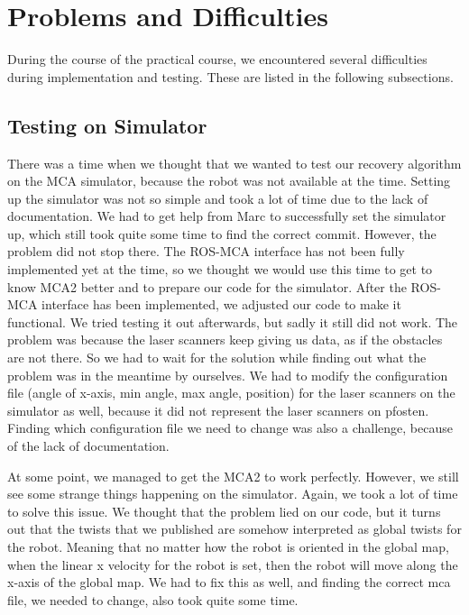 \section{Problems and Difficulties} \label{problems}
During the course of the practical course, we encountered several difficulties during implementation and testing. These are listed in the following subsections.

\subsection{Testing on Simulator}

There was a time when we thought that we wanted to test our recovery algorithm on the MCA simulator, because the robot was not available at the time. Setting up the simulator was not so simple and took a lot of time due to the lack of documentation. We had to get help from Marc to successfully set the simulator up, which still took quite some time to find the correct commit. However, the problem did not stop there. The ROS-MCA interface has not been fully implemented yet at the time, so we thought we would use this time to get to know MCA2 better and to prepare our code for the simulator. After the ROS-MCA interface has been implemented, we adjusted our code to make it functional. We tried testing it out afterwards, but sadly it still did not work. The problem was because the laser scanners keep giving us data, as if the obstacles are not there. So we had to wait for the solution while finding out what the problem was in the meantime by ourselves. We had to modify the configuration file (angle of x-axis, min angle, max angle, position) for the laser scanners on the simulator as well, because it did not represent the laser scanners on pfosten. Finding which configuration file we need to change was also a challenge, because of the lack of documentation. 

At some point, we managed to get the MCA2 to work perfectly. However, we still see some strange things happening on the simulator. Again, we took a lot of time to solve this issue. We thought that the problem lied on our code, but it turns out that the twists that we published are somehow interpreted as global twists for the robot. Meaning that no matter how the robot is oriented in the global map, when the linear x velocity for the robot is set, then the robot will move along the x-axis of the global map. We had to fix this as well, and finding the correct mca file, we needed to change, also took quite some time.

